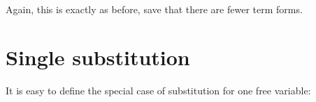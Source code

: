 Again, this is exactly as before, save that there are fewer term forms.

\hypertarget{single-substitution}{%
\section{Single substitution}\label{single-substitution}}

It is easy to define the special case of substitution for one free
variable:

\begin{fence}
\begin{code}%
\>[0]\AgdaSpace{}%
\AgdaSymbol{:}\AgdaSpace{}%
\AgdaSpace{}%
\AgdaSymbol{\{}\AgdaSpace{}%
\AgdaSymbol{\}}\AgdaSpace{}%
\AgdaSpace{}%
\AgdaSymbol{(}\AgdaSpace{}%
\AgdaSpace{}%
\AgdaSymbol{)}\AgdaSpace{}%
\AgdaSpace{}%
\AgdaSpace{}%
\AgdaSymbol{\{}\AgdaSymbol{\}}\AgdaSpace{}%
\AgdaSpace{}%
\AgdaSymbol{(}\AgdaSpace{}%
\AgdaOperator{\AgdaInductiveConstructor{,}}\AgdaSpace{}%
\AgdaSpace{}%
\AgdaSpace{}%
\AgdaSymbol{)}\AgdaSpace{}%
\AgdaSpace{}%
\AgdaSymbol{(}\AgdaSpace{}%
\AgdaSpace{}%
\AgdaSymbol{)}\<%
\\
\>[0]\AgdaSpace{}%
\AgdaSpace{}%
%
\>[20]\AgdaSymbol{=}%
\>[23]\<%
\\
\>[0]\AgdaSpace{}%
\AgdaSpace{}%
\AgdaSymbol{(}\AgdaSpace{}%
\AgdaSymbol{)}%
\>[20]\AgdaSymbol{=}%
\>[23]\AgdaSpace{}%
\<%
\\
%
\\[\AgdaEmptyExtraSkip]%
\>[0]\AgdaOperator{\AgdaFunction{\AgdaUnderscore{}[\AgdaUnderscore{}]}}\AgdaSpace{}%
\AgdaSymbol{:}%
\>[465I]\AgdaSpace{}%
\AgdaSymbol{\{}\AgdaSpace{}%
\AgdaSpace{}%
\AgdaSymbol{\}}\<%
\\
\>[465I][@{}l@{\AgdaIndent{0}}]%
\>[8]\AgdaSpace{}%
\AgdaSpace{}%
\AgdaOperator{\AgdaInductiveConstructor{,}}\AgdaSpace{}%
\AgdaSpace{}%
\AgdaSpace{}%
\<%

\end{code}
\end{fence}
